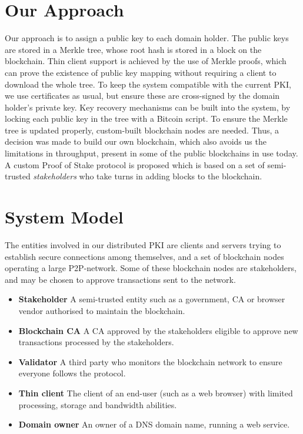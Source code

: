 \documentclass{style/kththesis}
\begin{document}
\section{Our Approach}
Our approach is to assign a public key to each domain holder. The public keys are stored in a Merkle tree, whose root hash is stored in a block on the blockchain. Thin client support is achieved by the use of Merkle proofs, which can prove the existence of public key mapping without requiring a client to download the whole tree. To keep the system compatible with the current PKI, we use certificates as usual, but ensure these are cross-signed by the domain holder's private key. Key recovery mechanisms can be built into the system, by locking each public key in the tree with a Bitcoin script. To ensure the Merkle tree is updated properly, custom-built blockchain nodes are needed. Thus, a decision was made to build our own blockchain, which also avoids us the limitations in throughput, present in some of the public blockchains in use today. A custom Proof of Stake protocol is proposed which is based on a set of semi-trusted \emph{stakeholders} who take turns in adding blocks to the blockchain. 

\section{System Model}
The entities involved in our distributed PKI are clients and servers trying to establish secure connections among themselves, and a set of blockchain nodes operating a large P2P-network. Some of these blockchain nodes are stakeholders, and may be chosen to approve transactions sent to the network.

\begin{itemize}
    \item \textbf{Stakeholder} A semi-trusted entity such as a government, CA or browser vendor authorised to maintain the blockchain.
    \item \textbf{Blockchain CA} A CA approved by the stakeholders eligible to approve new transactions processed by the stakeholders.
    \item \textbf{Validator} A third party who monitors the blockchain network to ensure everyone follows the protocol.
    \item \textbf{Thin client} The client of an end-user (such as a web browser) with limited processing, storage and bandwidth abilities.
    \item \textbf{Domain owner} An owner of a DNS domain name, running a web service.
\end{itemize}
\end{document}

